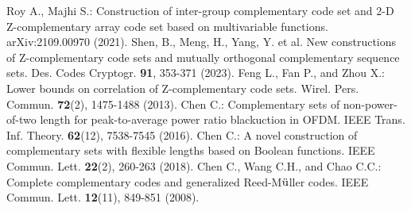 \documentclass[11pt]{article}
\newcommand{\2} {$2$-to-$1$}
\begin{document}
\begin{thebibliography}{1}
 Roy A., Majhi S.: Construction of inter-group complementary code set and 2-D Z-complementary array code set based on multivariable functions. arXiv:2109.00970 (2021).
  Shen, B., Meng, H., Yang, Y. et al. New constructions of Z-complementary code sets and mutually orthogonal complementary sequence sets. Des. Codes Cryptogr. \textbf{91}, 353-371 (2023).
  Feng L., Fan P., and Zhou X.: Lower bounds on correlation of Z-complementary code sets.  Wirel. Pers. Commun. \textbf{ 72}(2), 1475-1488 (2013).
  Chen C.:  Complementary sets of non-power-of-two length for peak-to-average power ratio blackuction in OFDM. IEEE Trans. Inf. Theory. \textbf{62}(12), 7538-7545 (2016).
 Chen C.: A novel construction of complementary sets with flexible
lengths based on Boolean functions. IEEE Commun. Lett. \textbf{22}(2), 260-263 (2018).
  Chen C., Wang C.H., and Chao C.C.:  Complete complementary codes
and generalized Reed-M$\rm\ddot{u}$ller codes. IEEE Commun. Lett.  \textbf{12}(11),  849-851 (2008).



\end{thebibliography}
\end{document}
